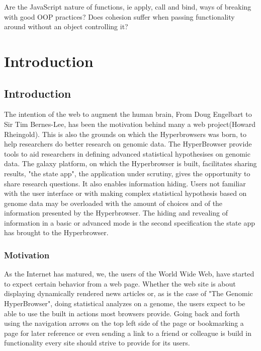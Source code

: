 \documentclass[english]{ifimaster}
\begin{document}
 Are the JavaScript nature of functions, ie apply, call and bind, ways of breaking with good OOP practices? Does cohesion suffer when passing functionality around without an object controlling it?

\part{Introduction}
\chapter{Introduction}
The intention of the web to augment the human brain, From Doug Engelbart to Sir Tim Bernes-Lee, has been the motivation behind many a web project(Howard Rheingold). This is also the grounds on which the Hyperbrowsers was born, to help researchers do better research on genomic data. The HyperBrowser provide tools to aid researchers in defining advanced statistical hypothesises on genomic data. The galaxy platform, on which the Hyperbrowser is built, facilitates sharing results, "the state app", the application under scrutiny, gives the opportunity to share research questions. It also enables information hiding. Users not familiar with the user interface or with making complex statistical hypothesis based on genome data may be overloaded with the amount of choices and of the information presented by the Hyperbrowser. The hiding and revealing of information in a basic or advanced mode is the second specification the state app has brought to the Hyperbrowser.

\section{Motivation}%


As the Internet has matured, we, the users of the World Wide Web, have started to expect certain behavior from a web page\parencite[p.85]{mikowski}. Whether the web site is about displaying dynamically rendered news articles or, as is the case of "The Genomic HyperBrowser", doing statistical analyzes on a genome, the users expect to be able to use the built in actions most browsers provide. Going back and forth using the navigation arrows on the top left side of the page or bookmarking a page for later reference or even sending a link to a friend or colleague is build in functionality every site should strive to provide for its users.
\end{document}
